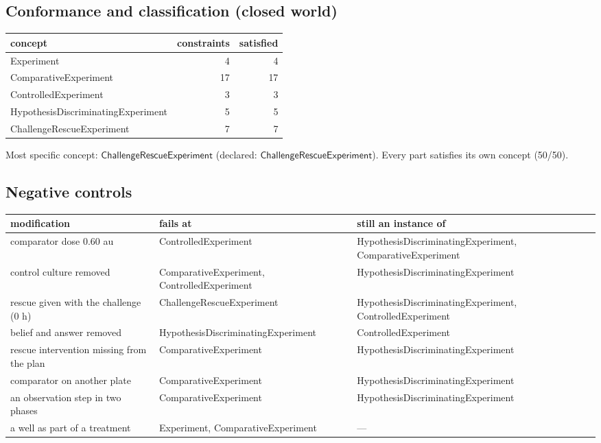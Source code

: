 \documentclass[10pt,a4paper]{article}
\begin{document}
\subsection*{Conformance and classification (closed world)}
\begin{tabular}{@{}lrr@{}}\toprule concept & constraints & satisfied \\ \midrule
Experiment & 4 & 4 \\
ComparativeExperiment & 17 & 17 \\
ControlledExperiment & 3 & 3 \\
HypothesisDiscriminatingExperiment & 5 & 5 \\
ChallengeRescueExperiment & 7 & 7 \\
\bottomrule\end{tabular}
\par Most specific concept: $\mathsf{ChallengeRescueExperiment}$ (declared: $\mathsf{ChallengeRescueExperiment}$). Every part satisfies its own concept (50/50).
\subsection*{Negative controls}
\begin{tabularx}{\linewidth}{@{}>{\raggedright\arraybackslash}p{4.6cm}>{\raggedright\arraybackslash}X>{\raggedright\arraybackslash}X@{}}\toprule modification & fails at & still an instance of \\ \midrule
comparator dose 0.60 au & ControlledExperiment & HypothesisDiscriminatingExperiment, ComparativeExperiment \\
control culture removed & ComparativeExperiment, ControlledExperiment & HypothesisDiscriminatingExperiment \\
rescue given with the challenge (0 h) & ChallengeRescueExperiment & HypothesisDiscriminatingExperiment, ControlledExperiment \\
belief and answer removed & HypothesisDiscriminatingExperiment & ControlledExperiment \\
rescue intervention missing from the plan & ComparativeExperiment & HypothesisDiscriminatingExperiment \\
comparator on another plate & ComparativeExperiment & HypothesisDiscriminatingExperiment \\
an observation step in two phases & ComparativeExperiment & HypothesisDiscriminatingExperiment \\
a well as part of a treatment & Experiment, ComparativeExperiment & --- \\
\bottomrule\end{tabularx}
\end{document}

